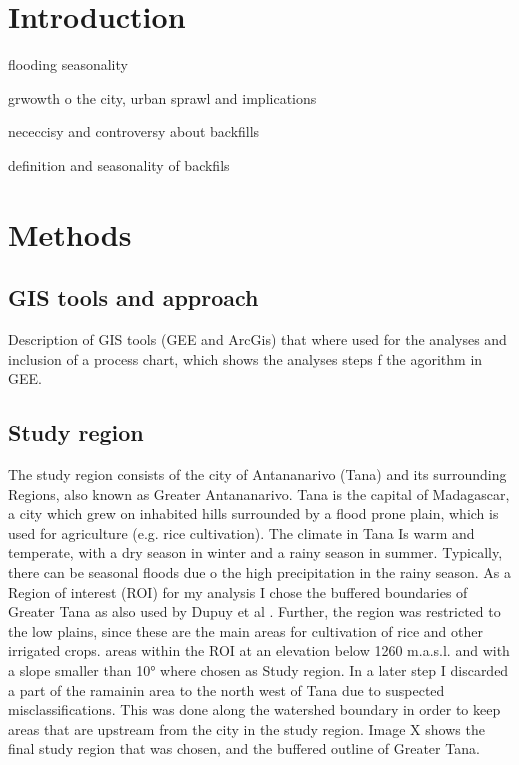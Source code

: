 \documentclass[11pt, letterpaper, oneside]{article}
\begin{document}
\tableofcontents

\section{Introduction}
flooding seasonality

grwowth o the city, urban sprawl and implications

nececcisy and controversy about backfills

definition and seasonality of backfils




\section{Methods}
\subsection{GIS tools and approach}
Description of GIS tools (GEE and ArcGis) that where used for the analyses and inclusion of a process chart, which shows the analyses steps f the agorithm in GEE.

\subsection{Study region}
The study region consists of the city of Antananarivo (Tana) and its surrounding Regions, also known as Greater Antananarivo. Tana is the capital of Madagascar, a city which grew on inhabited hills surrounded by a flood prone plain, which is used for agriculture (e.g. rice cultivation). The climate in Tana Is warm and temperate, with a dry season in winter and a rainy season in summer. Typically, there can be seasonal floods due o the high precipitation in the rainy season.  
As a Region of interest (ROI) for my analysis I chose the buffered boundaries of Greater Tana  as also used by Dupuy et al \cite{Dupuy.2020b}. Further, the region was restricted to the low plains, since these are the main areas for cultivation of rice and other irrigated crops. areas within the ROI at an elevation below 1260 m.a.s.l. and with a slope smaller than 10° where chosen as Study region. 
In a later step I discarded a part of the ramainin area to the north west of Tana due to suspected misclassifications. This was done along the watershed boundary in order to keep areas that are upstream from the city in the study region. Image X shows the final study region that was chosen, and the buffered outline of Greater Tana.
\end{document}
